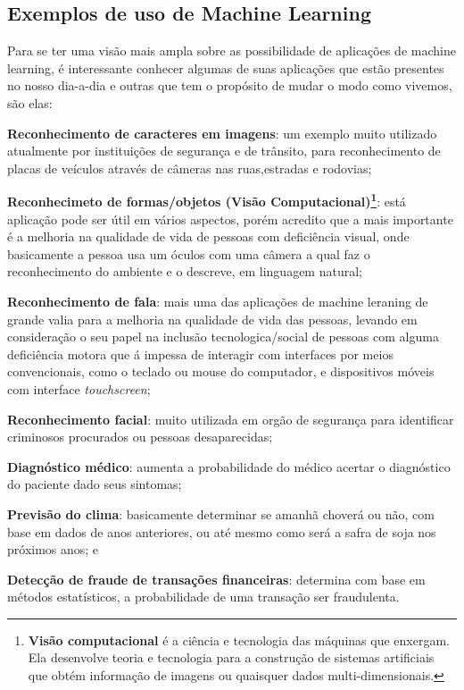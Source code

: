 \subsection{Exemplos de uso de Machine Learning}
\label{cap:exemplos-ml}

Para se ter uma visão mais ampla sobre as possibilidade de aplicações de machine learning,
 é interessante conhecer algumas de suas aplicações que estão presentes no nosso dia-a-dia e outras que tem o propósito de 
 mudar o modo como vivemos, são elas:

 \begin{alineas}
	\item \textbf{Reconhecimento de caracteres em imagens}: um exemplo muito utilizado atualmente por instituições de segurança e de trânsito, para 
	reconhecimento de placas de veículos através de câmeras nas ruas,estradas e rodovias;  
	\item \textbf{Reconhecimeto de formas/objetos (Visão Computacional)\footnote{\textbf{Visão computacional} é a ciência e tecnologia das máquinas que enxergam. Ela desenvolve teoria e tecnologia para a construção de sistemas artificiais que obtém informação de imagens ou quaisquer dados multi-dimensionais.\cite{vscomp}}}: está aplicação pode ser útil em vários aspectos, porém acredito que a mais importante 
	é a melhoria na qualidade de vida de pessoas com deficiência visual, onde basicamente a pessoa usa um óculos com uma câmera a qual faz o reconhecimento do ambiente
	e o descreve, em linguagem natural;  
	\item \textbf{Reconhecimento de fala}: mais uma das aplicações de machine leraning de grande valia para a melhoria na qualidade de vida das pessoas,
	levando em consideração o seu papel na inclusão tecnologica/social de pessoas com alguma deficiência motora que á impessa de interagir 
	com interfaces por meios convencionais, como o teclado ou  mouse do computador, e dispositivos móveis com interface \textit{touchscreen};
	\item \textbf{Reconhecimento facial}: muito utilizada em orgão de segurança para identificar criminosos procurados ou pessoas desaparecidas;
	\item \textbf{Diagnóstico médico}: aumenta a probabilidade do médico acertar o diagnóstico do paciente dado seus sintomas;   
	\item \textbf{Previsão do clima}: basicamente determinar se amanhã choverá ou não, com base em dados de anos anteriores, ou até mesmo como será a 
	safra de soja nos próximos anos; e 
	\item \textbf{Detecção de fraude de transações financeiras}: determina com base em métodos estatísticos, a probabilidade de uma transação ser fraudulenta.
 \end{alineas}

